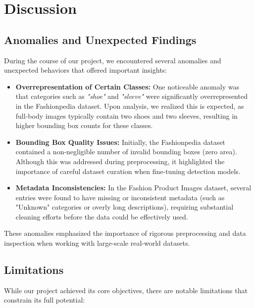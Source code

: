 \chapter{Discussion}
\label{chap:discussion}

\section{Anomalies and Unexpected Findings}

During the course of our project, we encountered several anomalies and unexpected behaviors that offered important insights:

\begin{itemize}
    \item \textbf{Overrepresentation of Certain Classes:} One noticeable anomaly was that categories such as \textit{"shoe"} and \textit{"sleeve"} were significantly overrepresented in the Fashionpedia dataset. Upon analysis, we realized this is expected, as full-body images typically contain two shoes and two sleeves, resulting in higher bounding box counts for these classes.

    \item \textbf{Bounding Box Quality Issues:} Initially, the Fashionpedia dataset contained a non-negligible number of invalid bounding boxes (zero area). Although this was addressed during preprocessing, it highlighted the importance of careful dataset curation when fine-tuning detection models.

    \item \textbf{Metadata Inconsistencies:} In the Fashion Product Images dataset, several entries were found to have missing or inconsistent metadata (such as "Unknown" categories or overly long descriptions), requiring substantial cleaning efforts before the data could be effectively used.
\end{itemize}

These anomalies emphasized the importance of rigorous preprocessing and data inspection when working with large-scale real-world datasets.

\section{Limitations}

While our project achieved its core objectives, there are notable limitations that constrain its full potential:

